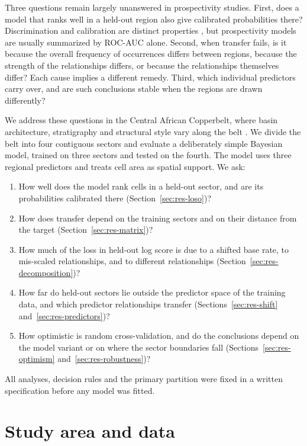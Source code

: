 \documentclass[pdflatex,sn-basic]{sn-jnl}%
\begin{document}
Three questions remain largely unanswered in prospectivity studies. First, does a model that ranks well in a held-out region also give calibrated probabilities there? Discrimination and calibration are distinct properties \citep{VanCalster2019}, but prospectivity models are usually summarized by ROC-AUC alone. Second, when transfer fails, is it because the overall frequency of occurrences differs between regions, because the strength of the relationships differs, or because the relationships themselves differ? Each cause implies a different remedy. Third, which individual predictors carry over, and are such conclusions stable when the regions are drawn differently?

We address these questions in the Central African Copperbelt, where basin architecture, stratigraphy and structural style vary along the belt \citep{Cailteux2005, Selley2005, Hitzman2012, Ndonfack2025}. We divide the belt into four contiguous sectors and evaluate a deliberately simple Bayesian model, trained on three sectors and tested on the fourth. The model uses three regional predictors and treats cell area as spatial support. We ask:
\begin{enumerate}
\item How well does the model rank cells in a held-out sector, and are its probabilities calibrated there (Section~\ref{sec:res-loso})?
\item How does transfer depend on the training sectors and on their distance from the target (Section~\ref{sec:res-matrix})?
\item How much of the loss in held-out log score is due to a shifted base rate, to mis-scaled relationships, and to different relationships (Section~\ref{sec:res-decomposition})?
\item How far do held-out sectors lie outside the predictor space of the training data, and which predictor relationships transfer (Sections~\ref{sec:res-shift} and~\ref{sec:res-predictors})?
\item How optimistic is random cross-validation, and do the conclusions depend on the model variant or on where the sector boundaries fall (Sections~\ref{sec:res-optimism} and~\ref{sec:res-robustness})?
\end{enumerate}
All analyses, decision rules and the primary partition were fixed in a written specification before any model was fitted.

\section{Study area and data}
\end{document}
